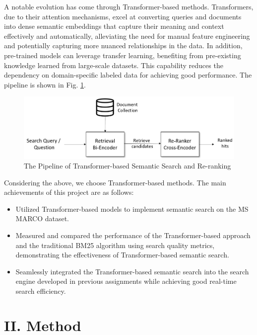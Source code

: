 \documentclass[11pt]{article}
\begin{document}
A notable evolution has come through Transformer-based methods.
Transformers, due to their attention mechanisms, excel at converting
queries and documents into dense semantic embeddings that capture their
meaning and context effectively and automatically, alleviating the need
for manual feature engineering and potentially capturing more nuanced
relationships in the data. In addition, pre-trained models can leverage
transfer learning, benefiting from pre-existing knowledge learned from
large-scale datasets. This capability reduces the dependency on
domain-specific labeled data for achieving good performance. The
pipeline is shown in Fig. \ref{semantic search pipeline}.

\begin{figure}
\includegraphics{readme.assets/InformationRetrieval.png}
\caption{The Pipeline of Transformer-based Semantic Search and Re-ranking \cite{c6}}
\label{semantic search pipeline}
\end{figure}

Considering the above, we choose Transformer-based methods. The main
achievements of this project are as follows:

\begin{itemize}
\item
  Utilized Transformer-based models to implement semantic search on the
  MS MARCO dataset.
\item
  Measured and compared the performance of the Transformer-based
  approach and the traditional BM25 algorithm using search quality
  metrics, demonstrating the effectiveness of Transformer-based semantic
  search.
\item
  Seamlessly integrated the Transformer-based semantic search into the
  search engine developed in previous assignments while achieving good
  real-time search efficiency.
\end{itemize}

\hypertarget{ii-method}{%
\section{II. Method}\label{ii-method}}
\end{document}
